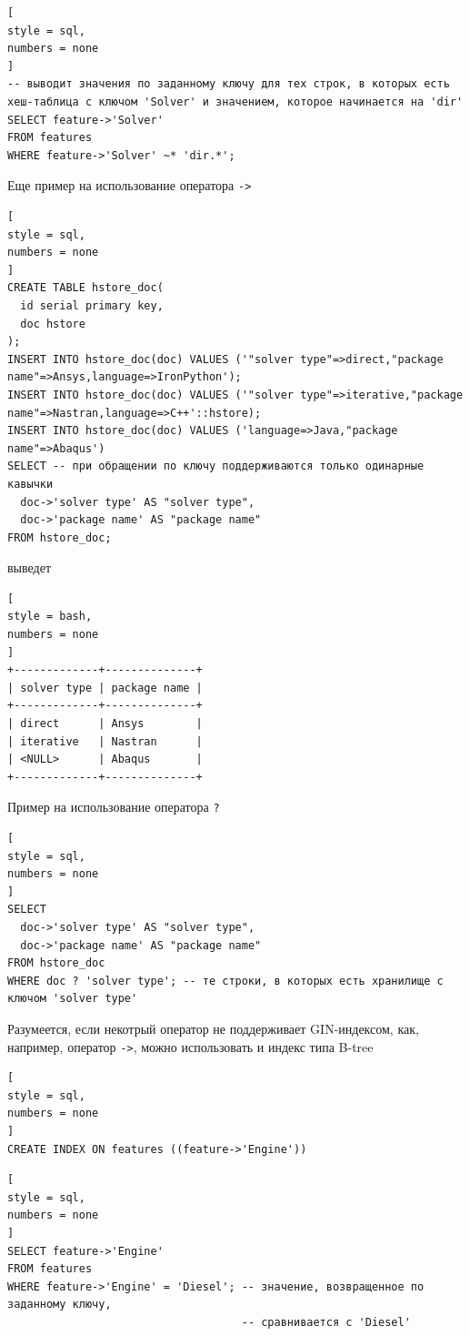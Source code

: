 \documentclass[%
	11pt,
	a4paper,
	utf8,
		]{article}
\begin{document}
\begin{lstlisting}[
style = sql,
numbers = none
]
-- выводит значения по заданному ключу для тех строк, в которых есть хеш-таблица с ключом 'Solver' и значением, которое начинается на 'dir'
SELECT feature->'Solver'
FROM features
WHERE feature->'Solver' ~* 'dir.*';
\end{lstlisting}

Еще пример на использование оператора \verb|->|
\begin{lstlisting}[
style = sql,
numbers = none
]
CREATE TABLE hstore_doc(
  id serial primary key,
  doc hstore
);
INSERT INTO hstore_doc(doc) VALUES ('"solver type"=>direct,"package name"=>Ansys,language=>IronPython');
INSERT INTO hstore_doc(doc) VALUES ('"solver type"=>iterative,"package name"=>Nastran,language=>C++'::hstore);
INSERT INTO hstore_doc(doc) VALUES ('language=>Java,"package name"=>Abaqus')
SELECT -- при обращении по ключу поддерживаются только одинарные кавычки
  doc->'solver type' AS "solver type",
  doc->'package name' AS "package name"
FROM hstore_doc;
\end{lstlisting}
выведет
\begin{lstlisting}[
style = bash,
numbers = none
]
+-------------+--------------+
| solver type | package name |
+-------------+--------------+
| direct      | Ansys        |
| iterative   | Nastran      |
| <NULL>      | Abaqus       |
+-------------+--------------+
\end{lstlisting}

Пример на использование оператора \verb|?|
\begin{lstlisting}[
style = sql,
numbers = none
]
SELECT
  doc->'solver type' AS "solver type",
  doc->'package name' AS "package name"
FROM hstore_doc
WHERE doc ? 'solver type'; -- те строки, в которых есть хранилище с ключом 'solver type'
\end{lstlisting}




Разумеется, если некотрый оператор не поддерживает GIN-индексом, как, например, оператор \verb|->|, можно использовать и индекс типа B-tree
\begin{lstlisting}[
style = sql,
numbers = none
]
CREATE INDEX ON features ((feature->'Engine'))
\end{lstlisting}

\begin{lstlisting}[
style = sql,
numbers = none
]
SELECT feature->'Engine'
FROM features
WHERE feature->'Engine' = 'Diesel'; -- значение, возвращенное по заданному ключу,
                                    -- сравнивается с 'Diesel'
\end{lstlisting}
\end{document}
